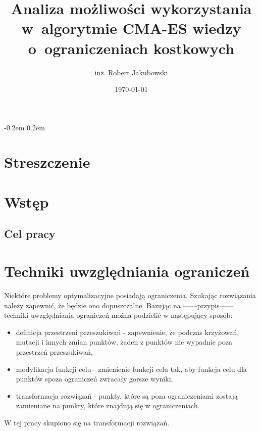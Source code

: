 \documentclass{mini}
\title{Analiza możliwości wykorzystania w~algorytmie CMA-ES wiedzy o~ograniczeniach kostkowych}
\author{inż. Robert Jakubowski}
\date{\today}
\begin{document}
\maketitle

\pagebreak
\thispagestyle{empty}

\openup -0.2em %
\tableofcontents
\openup 0.2em %

\thispagestyle{empty}
\raggedbottom
\pagebreak


\section{Streszczenie}

\pagebreak

\section{Wstęp}

\subsection{Cel pracy}

\pagebreak

\section{Techniki uwzględniania ograniczeń}
Niektóre problemy optymalizacyjne posiadają ograniczenia. Szukając rozwiązania należy zapewnić, że będzie ono dopuszczalne. Bazując na ------przypis------ techniki uwzględniania ograniczeń można podzielić w następujący sposób:
\begin{itemize}[noitemsep]
\item definicja przestrzeni przeszukiwań - zapewnienie, że podczas krzyżowań, mutacji i innych zmian punktów, żaden z punktów nie wypadnie poza przestrzeń przeszukiwań,
\item modyfikacja funkcji celu - zmienienie funkcji celu tak, aby funkcja celu dla punktów spoza ograniczeń zwracały gorsze wyniki,
\item transformacja rozwiązań - punkty, które są poza ograniczeniami zostają zamieniane na punkty, które znajdują się w ograniczeniach.
\end{itemize}

W tej pracy skupiono się na transformacji rozwiązań.
\end{document}
